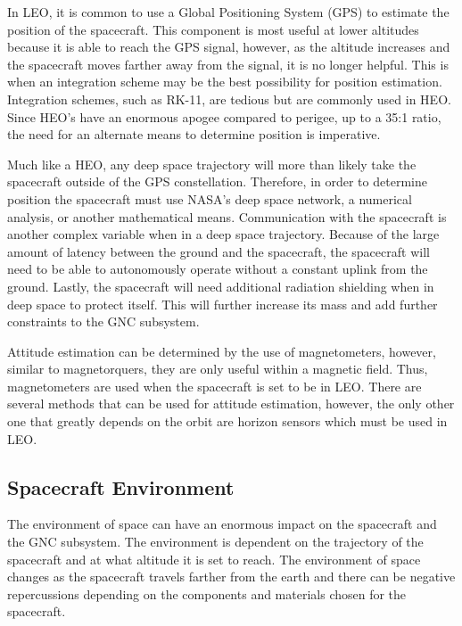 \documentclass{article}
\begin{document}
In LEO, it is common to use a Global Positioning System (GPS) to
estimate the position of the spacecraft. This component is most useful
at lower altitudes because it is able to reach the GPS signal,
however, as the altitude increases and the spacecraft moves farther
away from the signal, it is no longer helpful. This is when an
integration scheme may be the best possibility for position
estimation. Integration schemes, such as RK-11, are tedious but are
commonly used in HEO. Since HEO’s have an enormous apogee compared to
perigee, up to a 35:1 ratio, the need for an alternate means to
determine position is imperative\cite{cassidis}\cite{qp2}.  

Much like a HEO, any deep space trajectory will more than likely take
the spacecraft outside of the GPS constellation. Therefore, in order
to determine position the spacecraft must use NASA’s deep space
network, a numerical analysis, or another mathematical
means. Communication with the spacecraft is another complex variable
when in a deep space trajectory. Because of the large amount of
latency between the ground and the spacecraft, the spacecraft will
need to be able to autonomously operate without a constant uplink from
the ground. Lastly, the spacecraft will need additional radiation
shielding when in deep space to protect itself. This will further
increase its mass and add further constraints to the GNC subsystem. 

Attitude estimation can be determined by the use of magnetometers,
however, similar to magnetorquers, they are only useful within a
magnetic field. Thus, magnetometers are used when the spacecraft is
set to be in LEO. There are several methods that can be used for
attitude estimation, however, the only other one that greatly depends
on the orbit are horizon sensors which must be used in LEO.

\subsection{Spacecraft Environment}

The environment of space can have an enormous impact on the spacecraft
and the GNC subsystem. The environment is dependent on the trajectory
of the spacecraft and at what altitude it is set to reach. The
environment of space changes as the spacecraft travels farther from
the earth and there can be negative repercussions depending on the
components and materials chosen for the spacecraft.  
\end{document}
